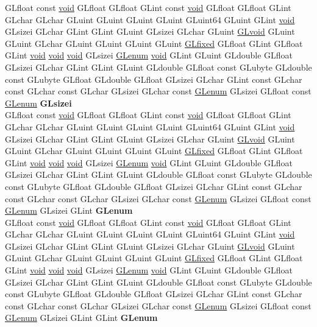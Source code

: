 \begin{DoxyCompactItemize}
\begin{tabbing}
\>GLfloat const \hyperlink{interfacevoid}{void} GLfloat GLfloat GLint const \hyperlink{interfacevoid}{void} GLfloat GLfloat GLint GLchar GLchar GLuint GLuint GLuint GLuint GLuint64 GLuint GLint \hyperlink{interfacevoid}{void} GLsizei GLchar GLint GLint GLuint GLsizei GLchar GLuint \hyperlink{interfacevoid}{GLvoid} GLuint GLuint GLchar GLuint GLuint GLuint GLuint \hyperlink{glheader_8h_ad6d3fa892df40dedf48ee6d84529ae5e}{GLfixed} GLfloat GLint GLfloat GLint \hyperlink{interfacevoid}{void} \hyperlink{interfacevoid}{void} \hyperlink{interfacevoid}{void} GLsizei \hyperlink{interfacevoid}{GLenum} \hyperlink{interfacevoid}{void} GLint GLuint GLdouble GLfloat GLsizei GLchar GLint GLint GLuint GLdouble GLfloat const GLubyte GLdouble const GLubyte GLfloat GLdouble GLfloat GLsizei GLchar GLint const GLchar const GLchar const GLchar GLsizei GLchar const \hyperlink{interfacevoid}{GLenum} GLsizei GLfloat const \hyperlink{interfacevoid}{GLenum} {\bfseries GLsizei}\\
\>GLfloat const \hyperlink{interfacevoid}{void} GLfloat GLfloat GLint const \hyperlink{interfacevoid}{void} GLfloat GLfloat GLint GLchar GLchar GLuint GLuint GLuint GLuint GLuint64 GLuint GLint \hyperlink{interfacevoid}{void} GLsizei GLchar GLint GLint GLuint GLsizei GLchar GLuint \hyperlink{interfacevoid}{GLvoid} GLuint GLuint GLchar GLuint GLuint GLuint GLuint \hyperlink{glheader_8h_ad6d3fa892df40dedf48ee6d84529ae5e}{GLfixed} GLfloat GLint GLfloat GLint \hyperlink{interfacevoid}{void} \hyperlink{interfacevoid}{void} \hyperlink{interfacevoid}{void} GLsizei \hyperlink{interfacevoid}{GLenum} \hyperlink{interfacevoid}{void} GLint GLuint GLdouble GLfloat GLsizei GLchar GLint GLint GLuint GLdouble GLfloat const GLubyte GLdouble const GLubyte GLfloat GLdouble GLfloat GLsizei GLchar GLint const GLchar const GLchar const GLchar GLsizei GLchar const \hyperlink{interfacevoid}{GLenum} GLsizei GLfloat const \hyperlink{interfacevoid}{GLenum} GLsizei GLint {\bfseries GLenum}\\
\>GLfloat const \hyperlink{interfacevoid}{void} GLfloat GLfloat GLint const \hyperlink{interfacevoid}{void} GLfloat GLfloat GLint GLchar GLchar GLuint GLuint GLuint GLuint GLuint64 GLuint GLint \hyperlink{interfacevoid}{void} GLsizei GLchar GLint GLint GLuint GLsizei GLchar GLuint \hyperlink{interfacevoid}{GLvoid} GLuint GLuint GLchar GLuint GLuint GLuint GLuint \hyperlink{glheader_8h_ad6d3fa892df40dedf48ee6d84529ae5e}{GLfixed} GLfloat GLint GLfloat GLint \hyperlink{interfacevoid}{void} \hyperlink{interfacevoid}{void} \hyperlink{interfacevoid}{void} GLsizei \hyperlink{interfacevoid}{GLenum} \hyperlink{interfacevoid}{void} GLint GLuint GLdouble GLfloat GLsizei GLchar GLint GLint GLuint GLdouble GLfloat const GLubyte GLdouble const GLubyte GLfloat GLdouble GLfloat GLsizei GLchar GLint const GLchar const GLchar const GLchar GLsizei GLchar const \hyperlink{interfacevoid}{GLenum} GLsizei GLfloat const \hyperlink{interfacevoid}{GLenum} GLsizei GLint GLint {\bfseries GLenum}\\

\end{tabbing}
\end{DoxyCompactItemize}
